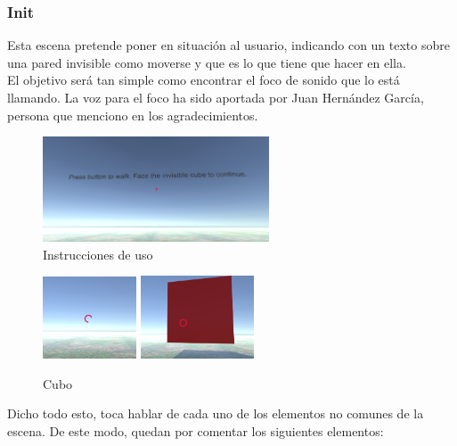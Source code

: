 	\subsubsection{Init}
\quad Esta escena pretende poner en situación al usuario, indicando con un texto sobre una pared invisible como moverse y que es lo que tiene que hacer en ella.\\

\quad El objetivo será tan simple como encontrar el foco de sonido que lo está llamando. La voz para el foco ha sido aportada por Juan Hernández García, persona que menciono en los agradecimientos.\\

\begin{figure}[htb]
	\centering
	\includegraphics[width=0.6\textwidth]{./imagenes/initInstructions}
	\caption{Instrucciones de uso}
\end{figure}

\begin{figure}[htb]
	\centering
	\includegraphics[width=0.248\textwidth]{./imagenes/inactiveCube}
	\includegraphics[width=0.3\textwidth]{./imagenes/activeCube}
	\caption{Cubo}
\end{figure}


\quad Dicho todo esto, toca hablar de cada uno de los elementos no comunes de la escena. De este modo, quedan por comentar los siguientes elementos:

